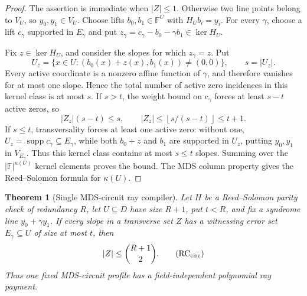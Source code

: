 \documentclass[12pt,a4paper]{amsart}
\numberwithin{equation}{section}
\newtheorem{theorem}{Theorem}[section]
\theoremstyle{remark}
\DeclareMathOperator{\supp}{supp}
\newcommand{\F}{\mathbb F}
\newcommand{\abs}[1]{\lvert #1\rvert}
\newcommand{\floor}[1]{\left\lfloor #1\right\rfloor}
\begin{document}
\begin{proof}
The assertion is immediate when \(\abs Z\le1\).  Otherwise two line
points belong to \(V_U\), so \(y_0,y_1\in V_U\).  Choose lifts
\(b_0,b_1\in\F^U\) with \(H_Ub_i=y_i\).  For every \(\gamma\), choose a
lift \(c_\gamma\) supported in \(E_\gamma\) and put
\(z_\gamma=c_\gamma-b_0-\gamma b_1\in\ker H_U\).

Fix \(z\in\ker H_U\), and consider the slopes for which
\(z_\gamma=z\).  Put
\[
 U_z=\{x\in U:(b_0(x)+z(x),b_1(x))\ne(0,0)\},
 \qquad s=\abs{U_z}.
\]
Every active coordinate is a nonzero affine function of \(\gamma\), and
therefore vanishes for at most one slope.  Hence the total number of active
zero incidences in this kernel class is at most \(s\).  If \(s>t\), the
weight bound on \(c_\gamma\) forces at least \(s-t\) active zeros, so
\[
 \abs{Z_z}(s-t)\le s,\qquad
 \abs{Z_z}\le\floor{s/(s-t)}\le t+1.
\]
If \(s\le t\), transversality forces
at least one active zero: without one,
\(U_z=\supp c_\gamma\subseteq E_\gamma\), while both \(b_0+z\) and
\(b_1\) are supported in \(U_z\), putting \(y_0,y_1\) in
\(V_{E_\gamma}\).  Thus this kernel class contains at most \(s\le t\)
slopes.  Summing over the \(\abs{\F}^{\kappa(U)}\) kernel elements proves
the bound.  The MDS column property gives the Reed--Solomon formula for
\(\kappa(U)\).
\end{proof}

\begin{theorem}[Single MDS-circuit ray compiler]
\label{thm:single-mds-circuit-ray}
Let \(H\) be a Reed--Solomon parity check of redundancy \(R\), let
\(U\subseteq D\) have size \(R+1\), put \(t<R\), and fix a syndrome line
\(y_0+\gamma y_1\).  If every slope in a transverse set \(Z\) has a witnessing error set
\(E_\gamma\subseteq U\) of size at most \(t\), then
\[
                         \abs Z\le\binom{R+1}{2}.   \tag{RC$_{\rm circ}$}
\]
Thus one fixed MDS-circuit profile has a field-independent polynomial ray
payment.
\end{theorem}
\end{document}
